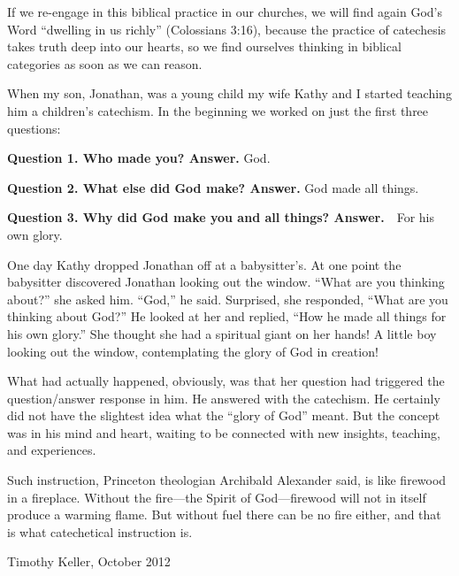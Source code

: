 If we re-engage in this biblical practice in our churches, we will find again God's Word ``dwelling in us richly'' (Colossians 3:16), because the practice of catechesis takes truth deep into our hearts, so we find ourselves thinking in biblical categories as soon as we can reason.

When my son, Jonathan, was a young child my wife Kathy and I started teaching him a children's catechism. In the beginning we worked on just the first three questions:

\textbf{Question 1. Who made you?\newline
Answer.} God.

\textbf{Question 2. What else did God make?\newline
Answer.} God made all things.

\textbf{Question 3. Why did God make you and all things?\newline
Answer.}\ \ For his own glory.

One day Kathy dropped Jonathan off at a babysitter's. At one point the babysitter discovered Jonathan looking out the window. ``What are you thinking about?'' she asked him. ``God,'' he said. Surprised, she responded, ``What are you thinking about God?'' He looked at her and replied, ``How he made all things for his own glory.'' She thought she had a spiritual giant on her hands! A little boy looking out the window, contemplating the glory of God in creation!

What had actually happened, obviously, was that her question had triggered the question/answer response in him. He answered with the catechism. He certainly did not have the slightest idea what the ``glory of God'' meant. But the concept was in his mind and heart, waiting to be connected with new insights, teaching, and experiences.

Such instruction, Princeton theologian Archibald Alexander said, is like firewood in a fireplace. Without the fire\thinspace{}---\thinspace{}the Spirit of God\thinspace{}---\thinspace{}firewood will not in itself produce a warming flame. But without fuel there can be no fire either, and that is what catechetical instruction is.

\bigskip

{\raggedleft
Timothy Keller, October 2012}

\cleardoublepage


